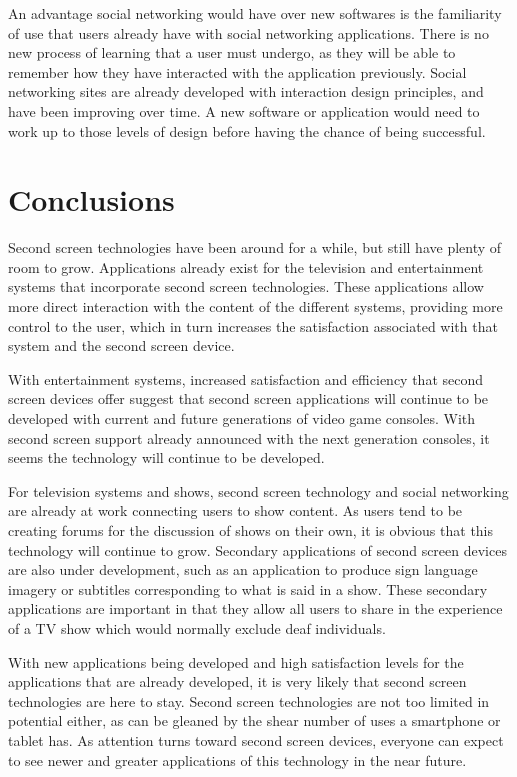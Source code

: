 \documentclass[11pt, oneside]{article}
\begin{document}
An advantage social networking would have over new softwares is the familiarity of use that users already have with social networking applications. There is no new process of learning that a user must undergo, as they will be able to remember how they have interacted with the application previously. Social networking sites are already developed with interaction design principles, and have been improving over time. A new software or application would need to work up to those levels of design before having the chance of being successful.

\section{Conclusions}
Second screen technologies have been around for a while, but still have plenty of room to grow. Applications already exist for the television and entertainment systems that incorporate second screen technologies. These applications allow more direct interaction with the content of the different systems, providing more control to the user, which in turn increases the satisfaction associated with that system and the second screen device. 
 
With entertainment systems, increased satisfaction and efficiency that second screen devices offer suggest that second screen applications will continue to be developed with current and future generations of video game consoles. With second screen support already announced with the next generation consoles, it seems the technology will continue to be developed. 

For television systems and shows, second screen technology and social networking are already at work connecting users to show content. As users tend to be creating forums for the discussion of shows on their own, it is obvious that this technology will continue to grow. Secondary applications of second screen devices are also under development, such as an application to produce sign language imagery or subtitles corresponding to what is said in a show. These secondary applications are important in that they allow all users to share in the experience of a TV show which would normally exclude deaf individuals. 

With new applications being developed and high satisfaction levels for the applications that are already developed, it is very likely that second screen technologies are here to stay. Second screen technologies are not too limited in potential either, as can be gleaned by the shear number of uses a smartphone or tablet has. As attention turns toward second screen devices, everyone can expect to see newer and greater applications of this technology in the near future.

{}

\end{document}
